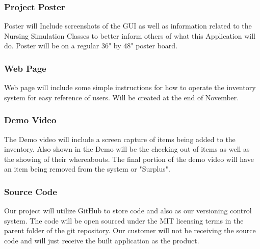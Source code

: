 \subsubsection{Project Poster}
Poster will Include screenshots of the GUI as well as information related to the Nursing Simulation Classes to better inform others of what this Application will do. Poster will be on a regular 36" by 48" poster board.

\subsubsection{Web Page}
Web page will include some simple instructions for how to operate the inventory system for easy reference of users. Will be created at the end of November.

\subsubsection{Demo Video}
The Demo video will include a screen capture of items being added to the inventory. Also shown in the Demo will be the checking out of items as well as the showing of their whereabouts. The final portion of the demo video will have an item being removed from the system or "Surplus".

\subsubsection{Source Code}

Our project will utilize GitHub to store code and also as our versioning control system. The code will be open sourced under the MIT licensing terms in the parent folder of the git repository. Our customer will not be receiving the source code and will just receive the built application as the product.


